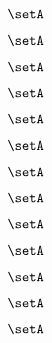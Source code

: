 \begin{forslides}
    \begin{equation}
        \label{eq:slides-translation-79}
        \setA
    \end{equation}

    \begin{equation}
        \label{eq:slides-translation-80}
        \setA
    \end{equation}

    \begin{equation}
        \label{eq:slides-translation-81}
        \setA
    \end{equation}

    \begin{equation}
        \label{eq:slides-translation-82}
        \setA
    \end{equation}

    \begin{equation}
        \label{eq:slides-translation-83}
        \setA
    \end{equation}

    \begin{equation}
        \label{eq:slides-translation-84}
        \setA
    \end{equation}

    \begin{equation}
        \label{eq:slides-translation-85}
        \setA
    \end{equation}

    \begin{equation}
        \label{eq:slides-translation-86}
        \setA
    \end{equation}

    \begin{equation}
        \label{eq:slides-translation-87}
        \setA
    \end{equation}

    \begin{equation}
        \label{eq:slides-translation-88}
        \setA
    \end{equation}

    \begin{equation}
        \label{eq:slides-translation-89}
        \setA
    \end{equation}

    \begin{equation}
        \label{eq:slides-translation-90}
        \setA
    \end{equation}

    \begin{equation}
        \label{eq:slides-translation-91}
        \setA
    \end{equation}


\end{forslides}
